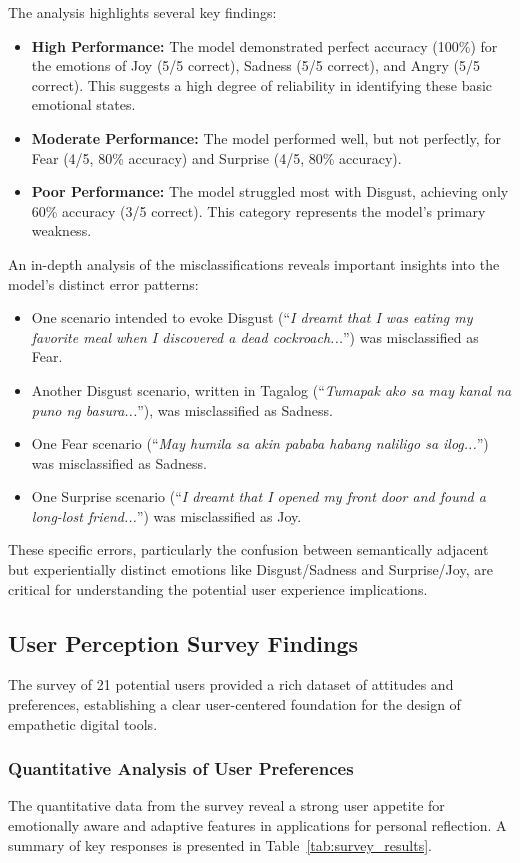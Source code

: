 \documentclass[conference]{IEEEtran}
\begin{document}
	The analysis highlights several key findings:
	\begin{itemize}
		\item \textbf{High Performance:} The model demonstrated perfect accuracy (100\%) for the emotions of Joy (5/5 correct), Sadness (5/5 correct), and Angry (5/5 correct). This suggests a high degree of reliability in identifying these basic emotional states.
		\item \textbf{Moderate Performance:} The model performed well, but not perfectly, for Fear (4/5, 80\% accuracy) and Surprise (4/5, 80\% accuracy).
		\item \textbf{Poor Performance:} The model struggled most with Disgust, achieving only 60\% accuracy (3/5 correct). This category represents the model's primary weakness.
	\end{itemize}
	
	An in-depth analysis of the misclassifications reveals important insights into the model's distinct error patterns:
	\begin{itemize}
		\item One scenario intended to evoke Disgust (``\textit{I dreamt that I was eating my favorite meal when I discovered a dead cockroach...}'') was misclassified as Fear.
		\item Another Disgust scenario, written in Tagalog (``\textit{Tumapak ako sa may kanal na puno ng basura...}''), was misclassified as Sadness.
		\item One Fear scenario (``\textit{May humila sa akin pababa habang naliligo sa ilog...}'') was misclassified as Sadness.
		\item One Surprise scenario (``\textit{I dreamt that I opened my front door and found a long-lost friend...}'') was misclassified as Joy.
	\end{itemize}
	These specific errors, particularly the confusion between semantically adjacent but experientially distinct emotions like Disgust/Sadness and Surprise/Joy, are critical for understanding the potential user experience implications.
	
	\subsection{User Perception Survey Findings}
	The survey of 21 potential users provided a rich dataset of attitudes and preferences, establishing a clear user-centered foundation for the design of empathetic digital tools.
	
	\subsubsection{Quantitative Analysis of User Preferences}
	The quantitative data from the survey reveal a strong user appetite for emotionally aware and adaptive features in applications for personal reflection. A summary of key responses is presented in Table~\ref{tab:survey_results}.
	
\end{document}
